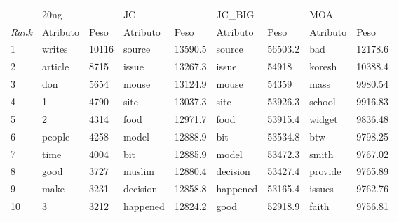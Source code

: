 \begin{tabular}{lllllllll}
	\toprule
	{}            & \multicolumn{2}{l}{20ng} & \multicolumn{2}{l}{JC} & \multicolumn{2}{l}{JC\_BIG} & \multicolumn{2}{l}{MOA}                                          \\
	\textit{Rank} & Atributo                 & Peso                   & Atributo
	              & Peso                     & Atributo               & Peso                        & Atributo                & Peso                                   \\
	\midrule
	1             & writes                   & 10116                  & source                      & 13590.5                 & source   & 56503.2 & bad     & 12178.6 \\[3pt]
	2             & article                  & 8715                   & issue                       & 13267.3                 & issue    & 54918   & koresh  & 10388.4 \\[3pt]
	3             & don                      & 5654                   & mouse                       & 13124.9                 & mouse    & 54359   & mass    & 9980.54 \\[3pt]
	4             & 1                        & 4790                   & site                        & 13037.3                 & site     & 53926.3 & school  & 9916.83 \\[3pt]
	5             & 2                        & 4314                   & food                        & 12971.7                 & food     & 53915.4 & widget  & 9836.48 \\[3pt]
	6             & people                   & 4258                   & model                       & 12888.9                 & bit      & 53534.8 & btw     & 9798.25 \\[3pt]
	7             & time                     & 4004                   & bit                         & 12885.9                 & model    & 53472.3 & smith   & 9767.02 \\[3pt]
	8             & good                     & 3727                   & muslim                      & 12880.4                 & decision & 53427.4 & provide & 9765.89 \\[3pt]
	9             & make                     & 3231                   & decision                    & 12858.8                 & happened & 53165.4 & issues  & 9762.76 \\[3pt]
	10            & 3                        & 3212                   & happened                    & 12824.2                 & good     & 52918.9 & faith   & 9756.81 \\
	\bottomrule
\end{tabular}


